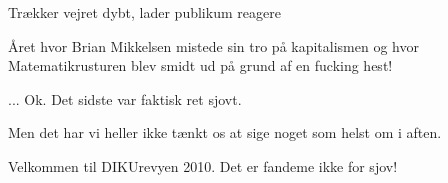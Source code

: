 \documentclass[a4paper,11pt]{article}
\begin{document}
\begin{sketch}
\scene Trækker vejret dybt, lader publikum reagere

 Året hvor Brian Mikkelsen mistede sin tro på kapitalismen og hvor
Matematikrusturen blev smidt ud på grund af en fucking hest!

 ... Ok. Det sidste var faktisk ret sjovt.

 Men det har vi heller ikke tænkt os at sige noget som helst om i aften.

 Velkommen til DIKUrevyen 2010. Det er fandeme ikke for sjov!


\end{sketch}
\end{document}
